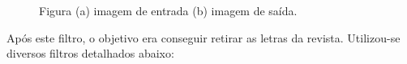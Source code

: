 \documentclass{article}
\begin{document}
	\begin{figure}[H]
		\centering
		\qquad
		\caption{Figura (a) imagem de entrada (b) imagem de saída.} 
	\end{figure}
	
	Após este filtro, o objetivo era conseguir retirar as letras da revista. Utilizou-se diversos filtros detalhados abaixo:
	
\end{document}
